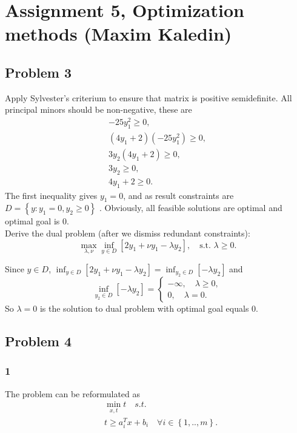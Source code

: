 \documentclass[a4paper,12pt,russian]{extreport}
\begin{document}
\chapter*{ Assignment 5, Optimization methods (Maxim Kaledin)}

\section*{Problem 3}

Apply Sylvester's criterium to ensure that matrix is positive semidefinite. All principal minors should be non-negative, these are
\begin{align*}
-25y_1^2 \geq 0,\\
(4y_1+2)(-25y_1^2) \geq 0,\\
3y_2(4y_1+2) \geq 0,\\
3y_2 \geq 0,\\
4y_1+2 \geq 0.
\end{align*}
The first inequality gives $y_1=0$, and as result constraints are $D=\left\lbrace y: y_1=0,y_2 \geq 0\right\rbrace$ . Obviously, all feasible solutions are optimal and optimal goal is $0$.\\

Derive the dual problem (after we dismiss redundant constraints):
$$
\max_{\lambda,\nu} \inf_{y \in D} \left[ 2y_1 + \nu y_1-\lambda y_2\right],\quad \text{s.t. } \lambda \geq 0.
$$

Since $y \in D$, $\inf_{y \in D} \left[ 2y_1 + \nu y_1-\lambda y_2\right]=\inf_{y_2 \in D} \left[-\lambda y_2\right]$ and
$$
\inf_{y_2 \in D} \left[-\lambda y_2\right] = \begin{cases}
-\infty,\quad \lambda\geq 0,\\
0, \quad \lambda=0.
\end{cases}
$$
So $\lambda=0$ is the solution to dual problem with optimal goal equals $0$.

\section* {Problem 4}

\subsection*{1}

The problem can be reformulated as
\begin{align*}
&\min_{x,t} t \quad s.t. \\
&t \geq a_{i}^Tx + b_i \quad \forall i \in \left\lbrace 1,..,m \right\rbrace.
\end{align*}
\end{document}
